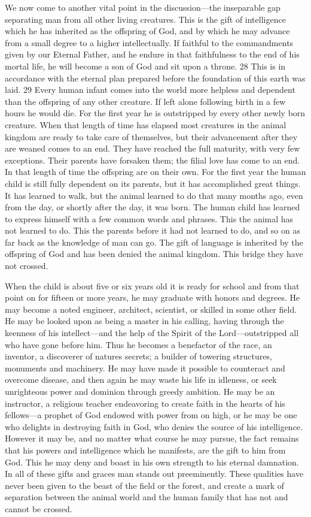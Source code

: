 We now come to another vital point in the discussion—the inseparable gap separating man
from all other living creatures. This is the gift of intelligence which he has inherited as the
offspring of God, and by which he may advance from a small degree to a higher
intellectually. If faithful to the commandments given by our Eternal Father, and he endure in
that faithfulness to the end of his mortal life, he will become a son of God and sit upon a
throne. 28 This is in accordance with the eternal plan prepared before the foundation of this
earth was laid. 29 Every human infant comes into the world more helpless and dependent
than the offspring of any other creature. If left alone following birth in a few hours he would
die. For the first year he is outstripped by every other newly born creature. When that length
of time has elapsed most creatures in the animal kingdom are ready to take care of
themselves, but their advancement after they are weaned comes to an end. They have reached
the full maturity, with very few exceptions. Their parents have forsaken them; the filial love
has come to an end. In that length of time the offspring are on their own. For the first year the
human child is still fully dependent on its parents, but it has accomplished great things. It has
learned to walk, but the animal learned to do that many months ago, even from the day, or
shortly after the day, it was born. The human child has learned to express himself with a few
common words and phrases. This the animal has not learned to do. This the parents before it
had not learned to do, and so on as far back as the knowledge of man can go. The gift of
language is inherited by the offspring of God and has been denied the animal kingdom. This
bridge they have not crossed.

When the child is about five or six years old it is ready for school and from that point on for
fifteen or more years, he may graduate with honors and degrees. He may become a noted
engineer, architect, scientist, or skilled in some other field. He may be looked upon as being a
master in his calling, having through the keenness of his intellect—and the help of the Spirit
of the Lord—outstripped all who have gone before him. Thus he becomes a benefactor of the
race, an inventor, a discoverer of natures secrets; a builder of towering structures, monuments
and machinery. He may have made it possible to counteract and overcome disease, and then
again he may waste his life in idleness, or seek unrighteous power and dominion through
greedy ambition. He may be an instructor, a religious teacher endeavoring to create faith in
the hearts of his fellows—a prophet of God endowed with power from on high, or he may be
one who delights in destroying faith in God, who denies the source of his intelligence.
However it may be, and no matter what course he may pursue, the fact remains that his
powers and intelligence which he manifests, are the gift to him from God. This he may deny
and boast in his own strength to his eternal damnation. In all of these gifts and graces man
stands out preeminently. These qualities have never been given to the beast of the field or the
forest, and create a mark of separation between the animal world and the human family that
has not and cannot be crossed.

